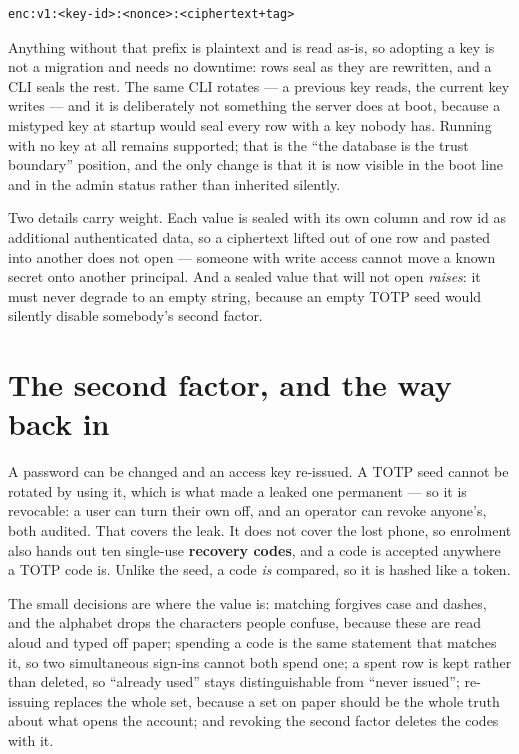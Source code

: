 \documentclass[11pt,a4paper]{report}
\begin{document}
\begin{lstlisting}
enc:v1:<key-id>:<nonce>:<ciphertext+tag>
\end{lstlisting}

Anything without that prefix is plaintext and is read as-is, so adopting a key is not a migration and needs no downtime: rows seal as they are rewritten, and a CLI seals the rest. The same CLI rotates --- a previous key reads, the current key writes --- and it is deliberately not something the server does at boot, because a mistyped key at startup would seal every row with a key nobody has. Running with no key at all remains supported; that is the ``the database is the trust boundary'' position, and the only change is that it is now visible in the boot line and in the admin status rather than inherited silently.

Two details carry weight. Each value is sealed with its own column and row id as additional authenticated data, so a ciphertext lifted out of one row and pasted into another does not open --- someone with write access cannot move a known secret onto another principal. And a sealed value that will not open \emph{raises}: it must never degrade to an empty string, because an empty TOTP seed would silently disable somebody's second factor.

\section{The second factor, and the way back in}

A password can be changed and an access key re-issued. A TOTP seed cannot be rotated by using it, which is what made a leaked one permanent --- so it is revocable: a user can turn their own off, and an operator can revoke anyone's, both audited. That covers the leak. It does not cover the lost phone, so enrolment also hands out ten single-use \textbf{recovery codes}, and a code is accepted anywhere a TOTP code is. Unlike the seed, a code \emph{is} compared, so it is hashed like a token.

The small decisions are where the value is: matching forgives case and dashes, and the alphabet drops the characters people confuse, because these are read aloud and typed off paper; spending a code is the same statement that matches it, so two simultaneous sign-ins cannot both spend one; a spent row is kept rather than deleted, so ``already used'' stays distinguishable from ``never issued''; re-issuing replaces the whole set, because a set on paper should be the whole truth about what opens the account; and revoking the second factor deletes the codes with it.
\end{document}
